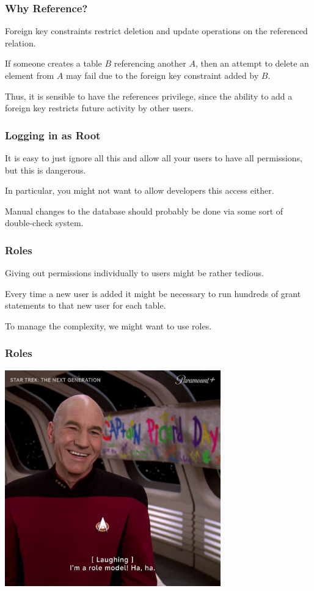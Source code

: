 \begin{frame}
\frametitle{Why Reference?}


Foreign key constraints restrict deletion and update operations on the referenced relation. 

If someone creates a table $B$ referencing another $A$, then an attempt to delete an element from $A$ may fail due to the foreign key constraint added by $B$. 

Thus, it is sensible to have the references privilege, since the ability to add a foreign key restricts future activity by other users.

\end{frame}



\begin{frame}
\frametitle{Logging in as Root}

It is easy to just ignore all this and allow all your users to have all permissions, but this is dangerous. 

In particular, you might not want to allow developers this access either. 

Manual changes to the database should probably be done via some sort of double-check system.


\end{frame}



\begin{frame}
\frametitle{Roles}

Giving out permissions individually to users might be rather tedious. 

Every time a new user is added it might be necessary to run hundreds of grant statements to that new user for each table.

To manage the complexity, we might want to use \alert{roles}. 

\end{frame}

\begin{frame}
\frametitle{Roles}

\begin{center}
	\includegraphics[width=0.7\textwidth]{images/role-model.jpg}
\end{center}


\end{frame}



